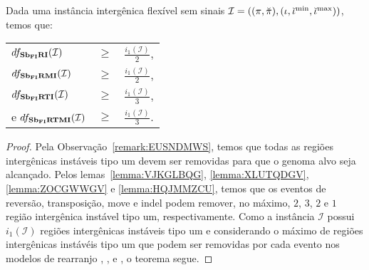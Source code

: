 \begin{theorem}\label{theorem:BOTBXFZQ}
Dada uma instância intergênica flexível sem sinais $\mathcal{I} = ((\pi,\breve\pi),(\iota,\breve\iota^{\min},\break\breve\iota^{\max}))$, temos que:

\begin{tabular}{lll}
  $df_{\textbf{Sb\textsubscript{FI}RI}}(\mathcal{I})$     & $ \ge $ & $\frac{i_1(\mathcal{I})}{2}$, \\
  $df_{\textbf{Sb\textsubscript{FI}RMI}}(\mathcal{I})$    & $ \ge $ & $\frac{i_1(\mathcal{I})}{2}$, \\
  $df_{\textbf{Sb\textsubscript{FI}RTI}}(\mathcal{I})$    & $ \ge $ & $\frac{i_1(\mathcal{I})}{3}$, \\
  e $df_{\textbf{Sb\textsubscript{FI}RTMI}}(\mathcal{I})$ & $ \ge $ & $\frac{i_1(\mathcal{I})}{3}$. \\
\end{tabular}
\end{theorem}
\begin{proof}
Pela Observação~\ref{remark:EUSNDMWS}, temos que todas as regiões intergênicas instáveis tipo um devem ser removidas para que o genoma alvo seja alcançado. Pelos lemas~\ref{lemma:VJKGLBQG}, \ref{lemma:XLUTQDGV}, \ref{lemma:ZOCGWWGV} e \ref{lemma:HQJMMZCU}, temos que os eventos de reversão, transposição, move e indel podem remover, no máximo, $2$, $3$, $2$ e $1$ região intergênica instável tipo um, respectivamente. Como a instância $\mathcal{I}$ possui $i_1(\mathcal{I})$ regiões intergênicas instáveis tipo um e considerando o máximo de regiões intergênicas instávéis tipo um que podem ser removidas por cada evento nos modelos de rearranjo \SbFIRI{}, \SbFIRMI{}, \SbFIRTI{} e \SbFIRTMI{}, o teorema segue.
\end{proof}

